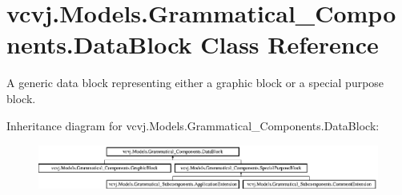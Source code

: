 \hypertarget{classvcvj_1_1_models_1_1_grammatical___components_1_1_data_block}{}\section{vcvj.\+Models.\+Grammatical\+\_\+\+Components.\+Data\+Block Class Reference}
\label{classvcvj_1_1_models_1_1_grammatical___components_1_1_data_block}


A generic data block representing either a graphic block or a special purpose block.  


Inheritance diagram for vcvj.\+Models.\+Grammatical\+\_\+\+Components.\+Data\+Block\+:\begin{figure}[H]
\begin{center}
\leavevmode
\includegraphics[height=1.477573cm]{classvcvj_1_1_models_1_1_grammatical___components_1_1_data_block}
\end{center}
\end{figure}
